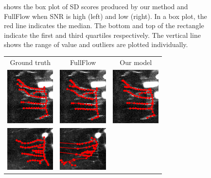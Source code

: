 \documentclass{article}
\begin{document}
\begin{figure}[b!]
\begin{minipage}[b]{0.25\linewidth}
	\end{minipage}
	\vspace{-10pt}
	\caption{\small{shows the box plot of SD scores produced by our method and FullFlow \cite{Chen2016} when SNR is high (left) and low (right). In a box plot, the red line indicates the median. The bottom and top of the rectangle indicate the first and third quartiles respectively. The vertical line shows the range of value and outliers are plotted individually.}}
	\label{fig:neuronboxplot}
\end{figure}

\begin{figure}[tb!]
	\centering
	\begin{tabular}{ccc} 
		\footnotesize{Ground truth} & \footnotesize{FullFlow} & \footnotesize{Our model} \vspace{-2pt} \\
		{\includegraphics[width=2.5cm]{img/gt_n3a.png}} &
		{\includegraphics[width=2.5cm]{img/ff_n3a.png}} &
		{\includegraphics[width=2.5cm]{img/our_n3a.png}}  \\
		{\includegraphics[width=2.5cm]{img/gt_n3b.png}} &
		{\includegraphics[width=2.5cm]{img/ff_n3b.png}} &

\end{tabular}
\end{figure}
\end{document}

